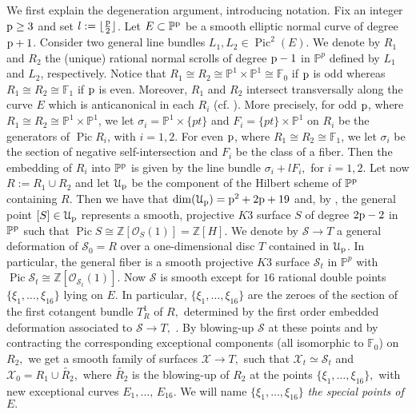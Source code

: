 \documentclass[plain]{amsart}
\def\Pic{\operatorname{Pic}}
\def\p{\rm{p}}
\begin{document}
We first explain the degeneration argument, introducing notation. 
 Fix an integer $\p \geq 3$ and set $l:= \lfloor \frac{\p}{2} \rfloor$.
Let $E \subset \mathbb P^{\p}$ be a smooth elliptic normal curve
of degree $\p+1$. Consider two general line bundles 
$L_1, L_2 \in \Pic^2(E) $.
We denote by $R_1$ and $R_2$ the (unique) rational normal scrolls of degree $\p-1$ in
$\mathbb P^{p}$ defined by $L_1$ and $L_2$, respectively. Notice that $R_1 \cong R_2 
\cong \mathbb P^1 \times \mathbb P^1\cong \mathbb F_0$ if $\p$ is odd 
whereas $R_1 \cong R_2 \cong \mathbb{F}_1$ if $\p$ is even. Moreover, $R_1$ and  $R_2$ intersect 
transversally along the curve $ E$ which  
 is anticanonical in each $R_i$ (cf. \cite[Lemma 1]{clm}).
More precisely, for odd $\p$, where $R_1 \cong R_2 
\cong \mathbb P^1 \times \mathbb P^1$, we let $\sigma_i=\mathbb P^1 \times \{pt\}$ and $F_i=\{pt\} \times \mathbb P^1$ on $R_i$ be the generators of $\Pic R_i$, with $i=1,2$.
For even $\p$, where $R_1 \cong R_2 \cong \mathbb{F}_1$, we let $\sigma_i$ be the section of negative self-intersection and $F_i$ be the class of a fiber. Then the embedding of $R_i$ into $\mathbb P^{\p}$ is given by the line bundle 
$\sigma_i+lF_i,$ for $i=1,2$.
Let now $R:= R_1 \cup R_2$ and let $\mathcal U_{\p}$ be the component of the Hilbert scheme of $\mathbb P^{\p}$ containing $R$. Then we have that $\dim(\mathcal U_{\p})={\p}^2+2{\p}+19$ and, by  \cite[Theorems 1 and 2]{clm}, 
 the general point $[S]\in\mathcal U_{\p}$ represents a smooth, projective $K3$ surface $S$ of degree $2{\p}-2$ in $\mathbb P^{\p}$ such that $\Pic S \cong \mathbb Z[\mathcal O_S(1)]=\mathbb Z[H].$ 
We denote by $\mathcal{S} \to T$ a general deformation of $\mathcal S_0=R$ over a
one-dimensional disc $T$ contained in $\mathcal U_{\p}$. In particular, the general fiber
is a smooth projective  $K3$ surface $\mathcal S_t$ in $\mathbb P^{p}$ with $\Pic \mathcal S_t \cong \mathbb Z [\mathcal O _{\mathcal S_t}(1)]$.
Now $\mathcal{S}$ is smooth except for $16$ rational double points $\{\xi_1, \ldots, \xi_{16}\}$ lying on
$E.$ In particular, $\{\xi_1, \ldots, \xi_{16}\}$ are the zeroes  of the section of the first cotangent bundle
$T^1_R$ of $R,$ determined by the first order embedded deformation associated to $\mathcal S\to T,$
\cite[pp. 644-647]{clm}. By blowing-up $\mathcal S$ at these points and by contracting the corresponding 
exceptional components (all isomorphic to $\mathbb F_0$) on $R_2,$ we get a smooth family of surfaces $\mathcal X\to T,$ such that $\mathcal X_t\simeq\mathcal S_t$ and 
$\mathcal X_0=R_1\cup \tilde{R_2},$ where $\tilde{R_2}$ is the blowing-up of $R_2$ at the points  $\{\xi_1, \ldots, \xi_{16}\},$
with new exceptional curves $E_1, \ldots,\,E_{16}.$ We will name $\{\xi_1, \ldots, \xi_{16}\}$ {\it the special points of} $E.$
\end{document}
